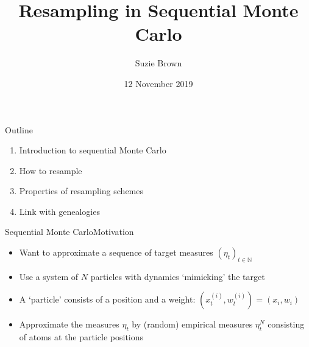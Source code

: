 \documentclass[aspectratio=169]{beamer}
\title[Resampling in SMC]{Resampling in Sequential Monte Carlo}
\author{Suzie Brown}
\date{12 November 2019}
\theoremstyle{definition}
\begin{document}
\begin{frame}
\maketitle
\end{frame}


\begin{frame}{Outline}
\begin{enumerate}
\item Introduction to sequential Monte Carlo
\item How to resample
\item Properties of resampling schemes
\item Link with genealogies
\end{enumerate}

\end{frame}


\begin{frame}{Sequential Monte Carlo}{Motivation}
\begin{itemize}
\item Want to approximate a sequence of target measures $(\eta_t)_{t\in\mathbb{N}}$
\item Use a system of $N$ particles with dynamics `mimicking' the target
\item A `particle' consists of a position and a weight: $(x_t^{(i)}, w_t^{(i)}) = (x_i, w_i)$
\item Approximate the measures $\eta_t$ by (random) empirical measures $\eta_t^N$ consisting of atoms at the particle positions
\end{itemize}

\end{frame}
\end{document}
